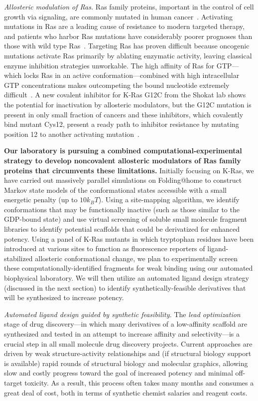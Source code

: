 \documentclass[10pt]{article}
\begin{document}
\emph{Allosteric modulation of Ras.}  
Ras family proteins, important in the control of cell growth via signaling, are commonly mutated in human cancer~\cite{Pylayeva-Gupta:2011:Nat.Rev.Cancer}. 
Activating mutations in Ras are a leading cause of resistance to modern targeted therapy, and patients who harbor Ras mutations have considerably poorer prognoses than those with wild type Ras~\cite{Mak:2015:Clin.LungCancer}. 
Targeting Ras has proven difficult because oncogenic mutations activate Ras primarily by ablating enzymatic activity, leaving classical enzyme inhibition strategies unworkable.
The high affinity of Ras for GTP---which locks Ras in an active conformation---combined with high intracellular GTP concentrations makes outcompeting the bound nucleotide extremely difficult~\cite{Ostrem:2013:Naturea}.
A new covalent inhibitor for K-Ras G12C from the Shokat lab shows the potential for inactivation by allosteric modulators, but the G12C mutation is present in only small fraction of cancers and these inhibitors, which covalently bind mutant Cys12, present a ready path to inhibitor resistance by mutating position 12 to another activating mutation~\cite{Ostrem:2013:Naturea}.

{\bf Our laboratory is pursuing a combined computational-experimental strategy to develop noncovalent allosteric modulators of Ras family proteins that circumvents these limitations.}
Initially focusing on K-Ras, we have carried out massively parallel simulations on Folding@home to construct Markov state models of the conformational states accessible with a small energetic penalty (up to $10 k_B T$).
Using a site-mapping algorithm, we identify conformations that may be functionally inactive (such as those similar to the GDP-bound state) and use virtual screening of soluble small molecule fragment libraries to identify potential scaffolds that could be derivatized for enhanced potency.
Using a panel of K-Ras mutants in which tryptophan residues have been introduced at various sites to function as fluorescence reporters of ligand-stabilized allosteric conformational change, we plan to experimentally screen these computationally-identified fragments for weak binding using our automated biophysical laboratory.
We will then utilize an automated ligand design strategy (discussed in the next section) to identify synthetically-feasible derivatives that will be synthesized to increase potency.

\emph{Automated ligand design guided by synthetic feasibility.}
The \emph{lead optimization} stage of drug discovery---in which many derivatives of a low-affinity scaffold are synthesized and tested in an attempt to increase affinity and selectivity---is a crucial step in all small molecule drug discovery projects.
Current approaches are driven by weak structure-activity relationships and (if structural biology support is available) rapid rounds of structural biology and molecular graphics, allowing slow and costly progress toward the goal of increased potency and minimal off-target toxicity.
As a result, this process often takes many months and consumes a great deal of cost, both in terms of synthetic chemist salaries and reagent costs.
\end{document}
